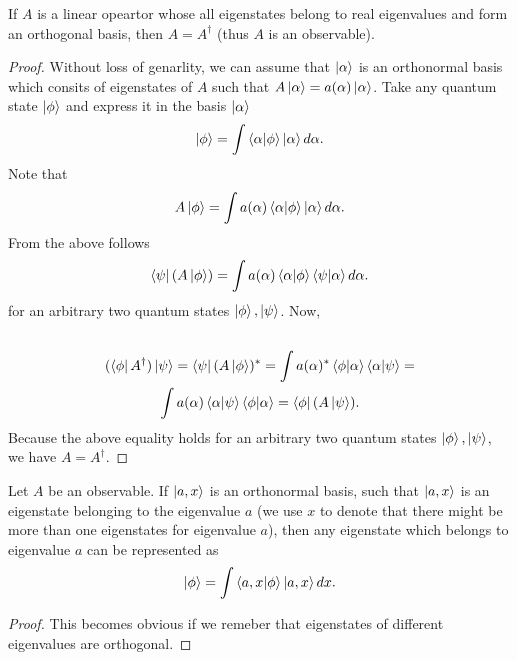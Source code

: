 \documentclass[main.tex]{subfiles}
\begin{document}
\begin{proposition} If $A$ is a linear opeartor whose all eigenstates belong to real eigenvalues and form an orthogonal basis, then $A = A^\dagger$ (thus $A$ is an observable). 
\end{proposition}
\begin{proof}
Without loss of genarlity, we can assume that $\ket{\alpha}$ is an orthonormal basis which consits of eigenstates of $A$ such that $A \ket{\alpha} = a(\alpha)\ket{\alpha}$. Take any quantum state $\ket{\phi}$ and express it in the basis $\ket{\alpha}$
\begin{equation}
\ket{\phi} = \int \bra{\alpha}\ket{\phi}\ket{\alpha} d\alpha.
\end{equation}
Note that 
\begin{equation}
A\ket{\phi} = \int a(\alpha) \bra{\alpha}\ket{\phi}\ket{\alpha} d\alpha.
\end{equation}
From the above follows
\begin{equation}
\bra{\psi}(A\ket{\phi}) = \int a(\alpha) \bra{\alpha}\ket{\phi}\bra{\psi}\ket{\alpha} d\alpha.
\end{equation}
for an arbitrary two quantum states $\ket{\phi}, \ket{\psi}$.
Now, 
\begin{multline*}
\\
(\bra{\phi}A^\dagger)\ket{\psi} = \bra{\psi}(A\ket{\phi})^* = \int a(\alpha)^* \bra{\phi}\ket{\alpha}\bra{\alpha}\ket{\psi} = \\ 
\int a(\alpha) \bra{\alpha}\ket{\psi} \bra{\phi}\ket{\alpha} = \bra{\phi}(A\ket{\psi}).\\
\end{multline*}
Because the above equality holds for an arbitrary two quantum states $\ket{\phi}, \ket{\psi}$, we have $A = A^\dagger$.
\end{proof}



\begin{proposition}
\label{eigenstate-representation}
Let $A$ be an observable. If $\ket{a, x}$ is an orthonormal basis, such that $\ket{a, x}$ is an eigenstate belonging to the eigenvalue $a$ (we use $x$ to denote that there might be more than one eigenstates for eigenvalue $a$), then any eigenstate which belongs to eigenvalue $a$ can be represented as
\begin{equation}
\ket{\phi} = \int \bra{a, x}\ket{\phi} \ket{a, x} d x.
\end{equation}
\end{proposition}
\begin{proof}
This becomes obvious if we remeber that eigenstates of different eigenvalues are orthogonal.
\end{proof}
\end{document}
